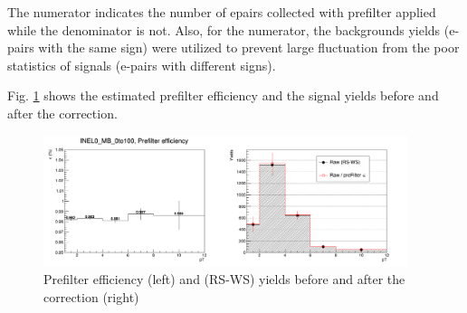 The numerator indicates the number of e\Xim pairs collected with prefilter applied while the denominator is not. Also, for the numerator, the backgrounds yields (e-\Xim pairs with the same sign) were utilized to prevent large fluctuation from the poor statistics of signals (e-\Xim pairs with different signs).

Fig. \ref{fig:s2_preFEff} shows the estimated prefilter efficiency and the signal yields before and after the correction.

\vspace{\columnsep}
\begin{figure}[h]
    \centering
    \includegraphics[width=0.95\textwidth]{plots/s2_preFCorr_INEL0_MB_0to100.png}
    \caption{Prefilter efficiency (left) and (RS-WS) yields before and after the correction (right)}
    \label{fig:s2_preFEff}
\end{figure}


\clearpage
\paragraph{}\mbox{}\\[1pt]

